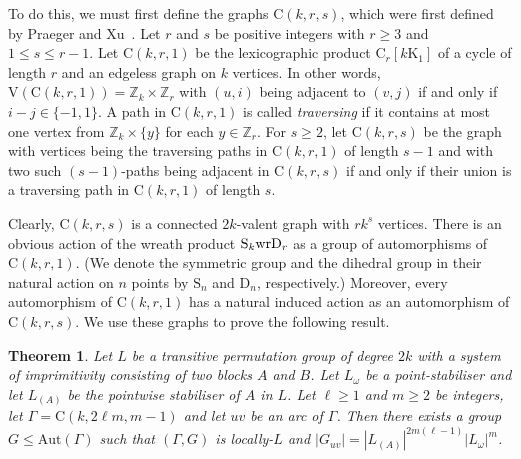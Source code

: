 \documentclass{amsart}
\newtheorem{theorem}{Theorem}
\theoremstyle{definition}
\begin{document}
To do this, we must first define the graphs ${\mathrm C}(k,r,s)$, which were first defined by Praeger and Xu~\cite{PraegerXu}.  Let $r$ and $s$ be positive integers with $r\geq 3$ and $1\leq s\leq r-1$. Let ${\mathrm C}(k,r,1)$ be the lexicographic product ${\mathrm C}_r[k{\mathrm K}_1]$ of a cycle of length $r$ and an edgeless graph on $k$ vertices. In other words, ${\mathrm V}({\mathrm C}(k,r,1))={\mathbb Z}_k\times{\mathbb Z}_r$ with $(u,i)$ being adjacent to $(v,j)$ if and only if $i-j \in \{-1,1\}$. A path in ${\mathrm C}(k,r,1)$ is called {\em traversing} if it contains at most one vertex from ${\mathbb Z}_k\times\{y\}$ for each $y\in{\mathbb Z}_r$. For $s\geq 2$, let ${\mathrm C}(k,r,s)$ be the graph with vertices being the traversing paths in ${\mathrm C}(k,r,1)$ of length $s-1$ and with two such $(s-1)$-paths being adjacent in ${\mathrm C}(k,r,s)$ if and only if their union is a traversing path in ${\mathrm C}(k,r,1)$ of length $s$.

 Clearly, ${\mathrm C}(k,r,s)$ is a connected $2k$-valent graph with $rk^s$ vertices. There is an obvious action of the wreath product ${\mathrm{S}}_k{\mathop{\rm wr}}{\mathrm D}_r$ as a group of automorphisms of ${\mathrm C}(k,r,1)$. (We denote the symmetric group and the dihedral group in their natural action on $n$ points by ${\mathrm{S}}_n$ and ${\mathrm D}_n$, respectively.) Moreover, every automorphism of ${\mathrm C}(k,r,1)$ has a natural induced action as an automorphism of ${\mathrm C}(k,r,s)$. We use these graphs to prove the following result.

\begin{theorem}\label{theo:cons}
Let $L$ be a transitive permutation group of degree $2k$ with a system of imprimitivity consisting of two blocks $A$ and $B$. Let $L_\omega$ be a point-stabiliser and let $L_{(A)}$ be the pointwise stabiliser of $A$ in $L$. Let $\ell\ge 1$ and $m\ge 2$ be integers, let $\Gamma = {\mathrm C}(k,2\ell m,m-1)$ and let $uv$ be an arc of $\Gamma$. Then there exists a group $G \le {\mathrm{Aut}}(\Gamma)$ such that $(\Gamma,G)$ is locally-$L$ and $|G_{uv}| =|L_{(A)}|^{2 m (\ell -1)} |L_\omega|^m$.
\end{theorem}
\end{document}
